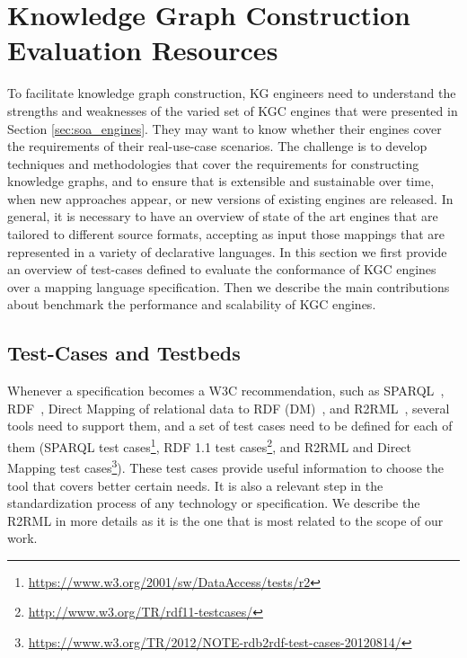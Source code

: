 \section{Knowledge Graph Construction Evaluation Resources}
\label{sec:soa_evaluations}
To facilitate knowledge graph construction, KG engineers need to understand the strengths and weaknesses of the varied set of KGC engines that were presented in Section \ref{sec:soa_engines}. They may want to know whether their engines cover the requirements of their real-use-case scenarios. The challenge is to develop techniques and methodologies that cover the requirements for constructing knowledge graphs, and to ensure that is extensible and sustainable over time, when new approaches appear, or new versions of existing engines are released. In general, it is necessary to have an overview of state of the art engines that are tailored to different source formats, accepting as input those mappings that are represented in a variety of declarative languages. In this section we first provide an overview of test-cases defined to evaluate the conformance of KGC engines over a mapping language specification. Then we describe the main contributions about benchmark the performance and scalability of KGC engines.


\subsection{Test-Cases and Testbeds}
Whenever a specification becomes a W3C recommendation, such as SPARQL~\citep{SPARQL}, RDF~\citep{RDF}, Direct Mapping of relational data to RDF (DM)~\citep{directMapping}, and R2RML~\citep{R2RML}, several tools need to support them, and a set of test cases need to be defined for each of them (SPARQL test cases\footnote{ \url{https://www.w3.org/2001/sw/DataAccess/tests/r2}}, RDF 1.1 test cases\footnote{ \url{http://www.w3.org/TR/rdf11-testcases/}}, and R2RML and Direct Mapping test cases\footnote{\url{https://www.w3.org/TR/2012/NOTE-rdb2rdf-test-cases-20120814/}}). These test cases provide useful information to choose the tool that covers better certain needs. It is also a relevant step in the standardization process of any technology or specification. We describe the R2RML in more details as it is the one that is most related to the scope of our work.

